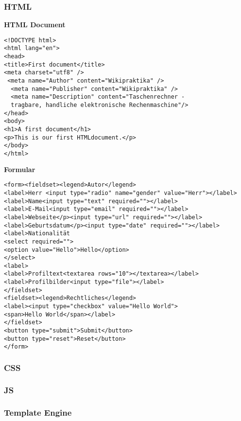 

\thispagestyle{fancy}
\raggedright
\footnotesize
\raggedcolumns
\begin{multicols*}{4}
\setlength{\premulticols}{1pt}
\setlength{\postmulticols}{1pt}
\setlength{\multicolsep}{1pt}
\setlength{\columnsep}{2pt}
\tiny

\subsubsection{HTML}

\textbf{HTML Document}
 \begin{verbatim}
<!DOCTYPE html>
<html lang="en"> 
<head>
<title>First document</title>
<meta charset="utf­8" /> 
 <meta name="Author" content="Wikipraktika" />
  <meta name="Publisher" content="Wikipraktika" />
  <meta name="Description" content="Taschenrechner - 
  tragbare, handliche elektronische Rechenmaschine"/>
</head>
<body>
<h1>A first document</h1>
<p>This is our first HTML­document.</p> 
</body>
</html>
\end{verbatim}

\textbf{Formular}
 \begin{verbatim}
<form><fieldset><legend>Autor</legend>
<label>Herr <input type="radio" name="gender" value="Herr"></label>
<label>Name<input type="text" required=""></label>
<label>E-Mail<input type="email" required=""></label>
<label>Webseite</p><input type="url" required=""></label>
<label>Geburtsdatum</p><input type="date" required=""></label>
<label>Nationalität
<select required="">
<option value="Hello">Hello</option>
</select>
<label>
<label>Profiltext<textarea rows="10"></textarea></label>
<label>Profilbilder<input type="file"></label>
</fieldset>
<fieldset><legend>Rechtliches</legend>
<label><input type="checkbox" value="Hello World">
<span>Hello World</span></label>
</fieldset>
<button type="submit">Submit</button>
<button type="reset">Reset</button>
</form>
\end{verbatim}

\subsubsection{CSS}

\subsubsection{JS}

\subsubsection{Template Engine}


\end{multicols*}
